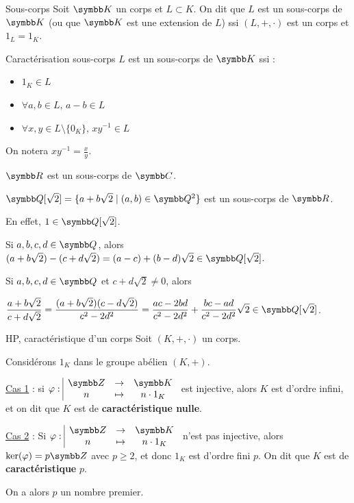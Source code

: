 \begin{definition}{Sous-corps}{}
    Soit $\K$ un corps et $L \subset K$. On dit que $L$ est un sous-corps de $\K$ (ou 
    que $\K$ est une extension de $L$) ssi $(L, +, \cdot)$ est un corps et 
    $1_L = 1_K$.
\end{definition}



\lvspace \avspace \begin{proposition}{Caractérisation sous-corps}{}
    $L$ est un sous-corps de $\K$ ssi :
    \begin{itemize}
        \item $1_K \in L$
        \item $\forall a, b \in L, \, a - b \in L$
        \item $\forall x, y \in L\setminus \{0_K\}, \, xy^{-1} \in L$
    \end{itemize}
\end{proposition}

\begin{remarque}
    On notera $xy^{-1} = \frac x y$. 
\end{remarque}

\begin{exemple}
    $\R$ est un sous-corps de $\C$.

    $\Q[\sqrt 2] = \{a + b \sqrt 2 \mid (a, b) \in \Q^2\}$ est un sous-corps de $\R$.

    En effet, $1 \in \Q[\sqrt 2]$.

    Si $a, b, c, d \in \Q$, alors $(a + b \sqrt 2) - (c + d \sqrt 2) = (a - c) + (b - d) \sqrt 2 \in \Q[\sqrt 2]$.

    Si $a, b, c, d \in \Q$ et $c + d \sqrt 2 \neq 0$, alors 
    
    $\displaystyle \frac {a + b \sqrt 2}{c + d \sqrt 2} = \frac{(a + b \sqrt 2)(c - d \sqrt 2)}{c^2 - 2d^2} = \frac{ac - 2bd}{c^2 - 2d^2} + \frac{bc - ad}{c^2 - 2d^2} \sqrt 2 \in \Q[\sqrt 2]$.
\end{exemple}



\begin{definition}{HP, caractéristique d'un corps}{}
    Soit $(K, +, \cdot)$ un corps.

    Considérons $1_K$ dans le groupe abélien $(K, +)$.

    \uline{Cas 1} : si $\fonction{\varphi}{\Z}{\K}{n}{n \cdot 1_K}$ est injective, alors 
    $K$ est d'ordre infini, et on dit que $K$ est de \textbf{caractéristique nulle}.

    \uline{Cas 2} : Si $\fonction{\varphi}{\Z}{\K}{n}{n \cdot 1_K}$ n'est pas injective, alors 
    $\ker(\varphi) = p \Z$ avec $p \geqslant 2$, et donc $1_K$ est d'ordre fini $p$. 
    On dit que $K$ est de \textbf{caractéristique} $p$. 

    On a alors $p$ un nombre premier.
\end{definition}

